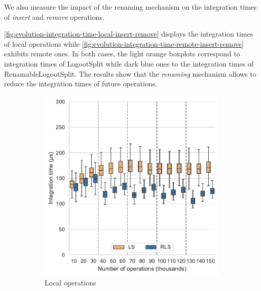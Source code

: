 \documentclass[sigplan,10pt,authorversion]{acmart}
\begin{document}
We also measure the impact of the renaming mechanism on the integration times of \emph{insert} and \emph{remove} operations.

\autoref{fig:evolution-integration-time-local-insert-remove} displays the integration times of local operations while \autoref{fig:evolution-integration-time-remote-insert-remove} exhibits remote ones.
In both cases, the light orange boxplots correspond to integration times of LogootSplit while dark blue ones to the integration times of RenamableLogootSplit.
The results show that the \emph{renaming} mechanism allows to reduce the integration times of future operations.

\begin{figure}[ht!]
    \begin{subfigure}{\columnwidth}
        \centering
        \includegraphics[width=0.9\columnwidth]{img/integration-time-boxplot-local-operations-without-outliers.pdf}
        \caption{Local operations}
        \label{fig:evolution-integration-time-local-insert-remove}
    \end{subfigure}
    \begin{subfigure}{\columnwidth}
        \centering

\end{subfigure}
\end{figure}
\end{document}
